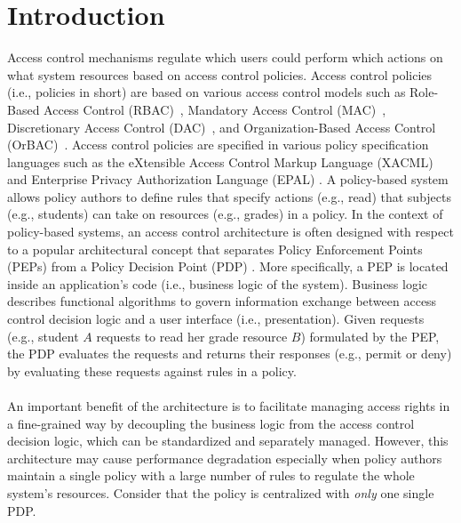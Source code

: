 \section{Introduction} \label{sec:introduction}
Access control mechanisms regulate which users
could perform which actions on what system resources based on access control policies.
Access control policies (i.e., policies in short) are based on various access control models such as Role-Based Access Control (RBAC)~\cite{ferraiolo:rbac}, Mandatory Access Control (MAC)~\cite{mac}, 
Discretionary Access Control (DAC)~\cite{dac}, and 
Organization-Based Access Control (OrBAC)~\cite{orbac}. Access control policies are specified in various policy specification languages such
as the eXtensible Access Control Markup Language (XACML) \cite{sunxacml}
and Enterprise Privacy Authorization Language (EPAL) \cite{epal}.
A policy-based system allows policy authors to define rules that specify actions (e.g., read) that subjects (e.g., students) can take on resources (e.g., grades) in a policy. 
In the context of policy-based systems, an access control architecture is often designed with respect to a popular
architectural concept that separates Policy Enforcement Points (PEPs) from a Policy Decision Point (PDP) \cite{separation}. More specifically, a PEP is located inside an 
application's code (i.e., business logic of the system). Business logic describes functional algorithms to govern information exchange between access control decision logic and a user interface (i.e., presentation).
Given requests (e.g., student $A$ requests to read her grade resource $B$) formulated by the PEP, the PDP evaluates the requests and returns their responses (e.g., permit or deny) by evaluating these requests
against rules in a policy. \\\\
An important benefit of the architecture is to facilitate managing access rights in a fine-grained way by
decoupling the business logic from the access control decision logic, which can be standardized and separately managed.
However, this architecture may cause performance degradation especially when policy authors maintain a single policy with a large number of rules to regulate the whole system's resources. 
Consider that the policy is centralized with \emph{only} one single PDP.
